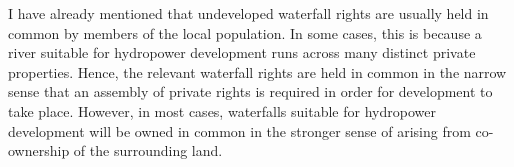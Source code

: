 
I have already mentioned that undeveloped waterfall rights are usually held in common by members of the local population. In some cases, this is because a river suitable for hydropower development runs across many distinct private properties. Hence, the relevant waterfall rights are held in common in the narrow sense that an assembly of private rights is required in order for development to take place. However, in most cases, waterfalls suitable for hydropower development will be owned in common in the stronger sense of arising from co-ownership of the surrounding land. %


